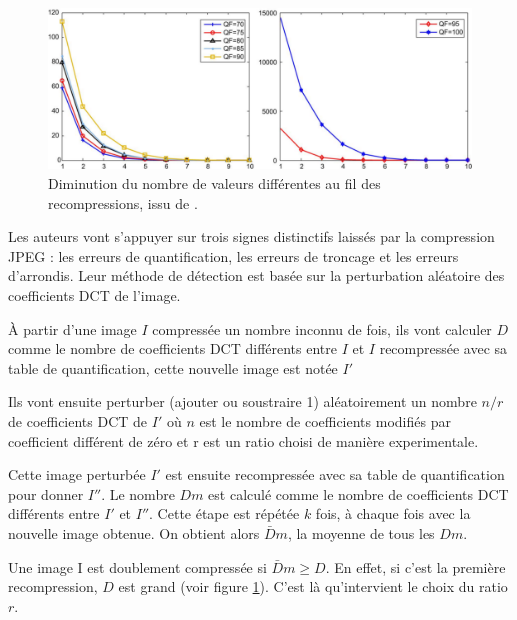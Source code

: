 \documentclass[utf8,final]{stageM2R} %
\begin{document}
\begin{figure}
  \begin{center}
    \includegraphics[width=130mm]{images/d_courbe}
    \caption{Diminution du nombre de valeurs différentes au fil des recompressions, issu de \autocite{huang2010detecting}.}
    \label{d_courbe}
  \end{center}
\end{figure}

Les auteurs vont s'appuyer sur trois signes distinctifs laissés par la compression JPEG : les erreurs de quantification, les erreurs de troncage et les erreurs d'arrondis. Leur méthode de détection est basée sur la perturbation aléatoire des coefficients DCT de l'image.

À partir d'une image $I$ compressée un nombre inconnu de fois, ils vont calculer $D$ comme le nombre de coefficients DCT différents entre $I$ et $I$ recompressée avec sa table de quantification, cette nouvelle image est notée $I'$

Ils vont ensuite perturber (ajouter ou soustraire 1) aléatoirement un nombre $n/r$ de coefficients DCT de $I'$ où $n$ est le nombre de coefficients modifiés par coefficient différent de zéro et r est un ratio choisi de manière experimentale.

Cette image perturbée $I'$ est ensuite recompressée avec sa table de quantification pour donner $I''$. Le nombre $Dm$ est calculé comme le nombre de coefficients DCT différents entre $I'$ et $I''$. Cette étape est répétée $k$ fois, à chaque fois avec la nouvelle image obtenue. On obtient alors $\bar{D}m$, la moyenne de tous les $Dm$.

Une image I est doublement compressée si $\bar{D}m \geqslant D$. En effet, si c'est la première recompression, $D$ est grand (voir figure \ref{d_courbe}). C'est là qu'intervient le choix du ratio $r$. 
\end{document}
